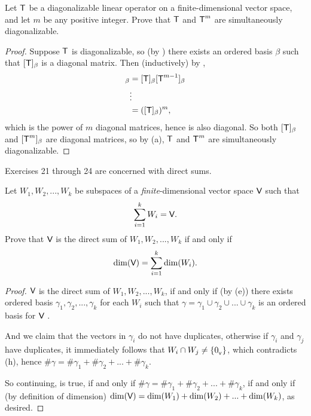 \begin{exercise} \label{exercise 5.2.20}
Let \(\textsf{T}\) be a diagonalizable linear operator on a finite-dimensional vector space, and let \(m\) be any positive integer.
Prove that \(\textsf{T}\) and \(\textsf{T}^m\) are simultaneously diagonalizable.
\end{exercise}

\begin{proof}
Suppose \(\textsf{T}\) is diagonalizable, so (by ) there exists an ordered basis \(\beta\) such that \([\textsf{T}]_{\beta}\) is a diagonal matrix.
Then (inductively) by ,
\begin{align*}
    [\T^m]_{\beta} & = [\T]_{\beta} [\T^{m - 1}]_{\beta} \\
        & \vdots \\
        & = ([\T]_{\beta})^m,
\end{align*}
which is the power of \(m\) diagonal matrices, hence is also diagonal.
So both \([\textsf{T}]_{\beta}\) and \([\textsf{T}^m]_{\beta}\) are diagonal matrices, so by (a), \(\textsf{T}\) and \(\textsf{T}^m\) are simultaneously diagonalizable.
\end{proof}

Exercises 21 through 24 are concerned with direct sums.

\begin{exercise} \label{exercise 5.2.21}
Let \(W_1, W_2, ..., W_k\) be subspaces of a \emph{finite}-dimensional vector space \(\textsf{V}\) such that
\[
    \sum_{i = 1}^k W_i = \textsf{V}.
\]
Prove that \(\textsf{V}\) is the direct sum of \(W_1, W_2, ..., W_k\) if and only if
\[
    \dim(\textsf{V}) = \sum_{i = 1}^k \dim(W_i).
\]
\end{exercise}

\begin{proof}
\(\textsf{V}\) is the direct sum of \(W_1, W_2, ..., W_k\),
if and only if (by (e)) there exists ordered basis \(\gamma_1, \gamma_2, ..., \gamma_k\) for each \(W_i\) such that \(\gamma = \gamma_1 \cup \gamma_2 \cup ... \cup \gamma_k\) is an ordered basis for \(\textsf{V}\) .

And we claim that the vectors in \(\gamma_i\) do not have duplicates, otherwise if \(\gamma_i\) and \(\gamma_j\) have duplicates, it immediately follows that \(W_i \cap W_j \ne \{ 0_{_{\textsf{V}}} \}\), which contradicts (h), hence \(\#\gamma = \#\gamma_1 + \#\gamma_2 + ... + \#\gamma_k\).

So continuing,  is true, if and only if \(\#\gamma = \#\gamma_1 + \#\gamma_2 + ... + \#\gamma_k\),
if and only if (by definition of dimension) \(\dim(\textsf{V}) = \dim(W_1) + \dim(W_2) + ... + \dim(W_k)\), as desired.
\end{proof}

